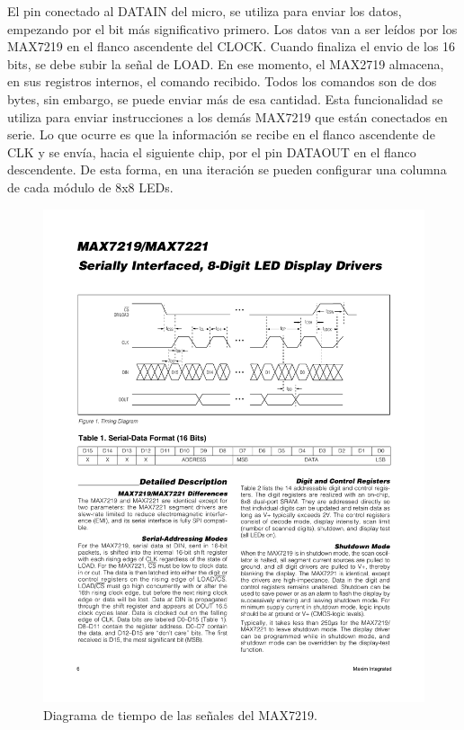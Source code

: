     El pin conectado al DATAIN del micro, se utiliza para enviar los datos, empezando por el bit más significativo primero. Los datos van a ser leídos por los MAX7219 en el flanco ascendente del CLOCK. Cuando finaliza el envio de los 16 bits, se debe subir la señal de LOAD. En ese momento, el MAX2719 almacena, en sus registros internos, el comando recibido. Todos los comandos son de dos bytes, sin embargo, se puede enviar más de esa cantidad. Esta funcionalidad se utiliza para enviar instrucciones a los demás MAX7219 que están conectados en serie. Lo que ocurre es que la información se recibe en el flanco ascendente de CLK y se envía, hacia el siguiente chip, por el pin DATAOUT en el flanco descendente. De esta forma, en una iteración se pueden configurar una columna de cada módulo de 8x8 LEDs.

    \begin{figure}[ht!]
        \centering
        \begin{center}
            \includegraphics[width=\textwidth]{imagenes/hw-conexiones/timingDiagram.pdf}
            \caption{Diagrama de tiempo de las señales del MAX7219.}
            \label{fig:spi-timing-diagram}
        \end{center}
    \end{figure}
    


